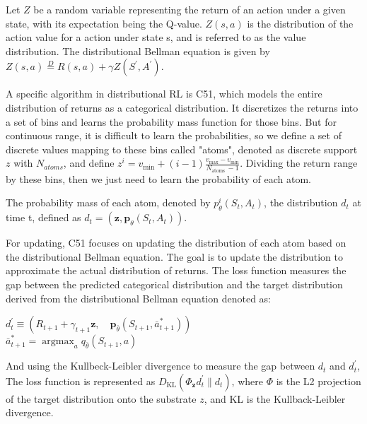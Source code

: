 \documentclass{article}
\begin{document}
Let $Z$ be a random variable representing the return of an action under a given state, with its expectation being the Q-value. $Z(s,a)$ is the distribution of the action value for a action under state s, and is referred to as the value distribution. The distributional Bellman equation is given by $Z(s, a) \stackrel{D}{=} R(s, a)+\gamma Z\left(S^{\prime}, A^{\prime}\right).$

A specific algorithm in distributional RL is C51, which models the entire distribution of returns as a categorical distribution. It discretizes the returns into a set of bins and learns the probability mass function for those bins. But for continuous range, it is difficult to learn the probabilities, so we define a set of discrete values mapping to these bins called "atoms", denoted as discrete support $z$ with $N_{atoms}$, and define $z^i=v_{\min }+(i-1) \frac{v_{\max }-v_{\min }}{N_{\text {atoms }}-1}$. Dividing the return range by these bins, then we just need to learn the probability of each atom.

The probability mass of each atom, denoted by $p_\theta^i\left(S_t, A_t\right)$, the distribution $d_t$ at time t, defined as $d_t=\left(\boldsymbol{z}, \boldsymbol{p}_\theta\left(S_t, A_t\right)\right).$

For updating, C51 focuses on updating the distribution of each atom based on the distributional Bellman equation. The goal is to update the distribution to approximate the actual distribution of returns. The loss function measures the gap between the predicted categorical distribution and the target distribution derived from the distributional Bellman equation denoted as:

\hspace*{\fill}

$d_t^{\prime} \equiv\left(R_{t+1}+\gamma_{t+1} \boldsymbol{z}, \quad \boldsymbol{p}_{\bar{\theta}}\left(S_{t+1}, \bar{a}_{t+1}^*\right)\right)$\\

$\bar{a}_{t+1}^*=\operatorname{argmax}_a q_{\bar{\theta}}\left(S_{t+1}, a\right)$

\hspace*{\fill}

And using the Kullbeck-Leibler divergence to measure the gap between $d_t$ and $d^{\prime}_t$, The loss function is represented as $D_{\mathrm{KL}}\left(\Phi_{\boldsymbol{z}} d_t^{\prime} \| d_t\right)$, where $\Phi$ is the L2 projection of the target distribution onto the substrate $z$, and KL is the Kullback-Leibler divergence.
\end{document}
